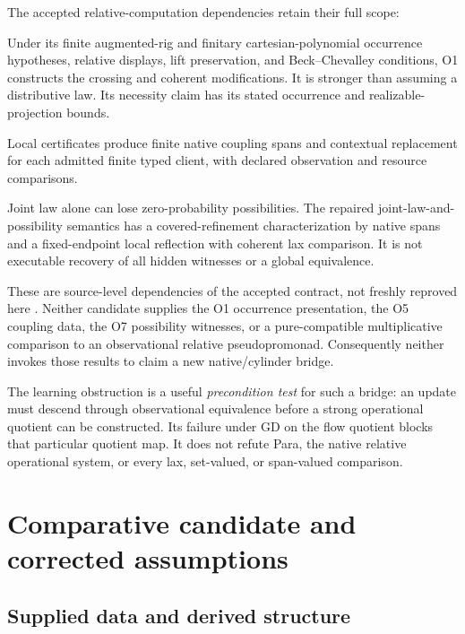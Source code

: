 \documentclass[11pt]{article}
\theoremstyle{remark}
\begin{document}
The accepted relative-computation dependencies retain their full scope:
\begin{description}[style=nextline,leftmargin=0pt]
\item[O1] Under its finite augmented-rig and finitary cartesian-polynomial occurrence hypotheses, relative displays, lift preservation, and Beck--Chevalley conditions, O1 constructs the crossing and coherent modifications. It is stronger than assuming a distributive law. Its necessity claim has its stated occurrence and realizable-projection bounds.
\item[O5] Local certificates produce finite native coupling spans and contextual replacement for each admitted finite typed client, with declared observation and resource comparisons.
\item[O7] Joint law alone can lose zero-probability possibilities. The repaired joint-law-and-possibility semantics has a covered-refinement characterization by native spans and a fixed-endpoint local reflection with coherent lax comparison. It is not executable recovery of all hidden witnesses or a global equivalence.
\end{description}
These are source-level dependencies of the accepted contract, not freshly reproved here \cite{Relative,Contract}. Neither candidate supplies the O1 occurrence presentation, the O5 coupling data, the O7 possibility witnesses, or a pure-compatible multiplicative comparison to an observational relative pseudopromonad. Consequently neither invokes those results to claim a new native/cylinder bridge.

The learning obstruction is a useful \emph{precondition test} for such a bridge: an update must descend through observational equivalence before a strong operational quotient can be constructed. Its failure under GD on the flow quotient blocks that particular quotient map. It does not refute Para, the native relative operational system, or every lax, set-valued, or span-valued comparison.

\section{Comparative candidate and corrected assumptions}
\label{sec:comparative}

\subsection{Supplied data and derived structure}
\end{document}
